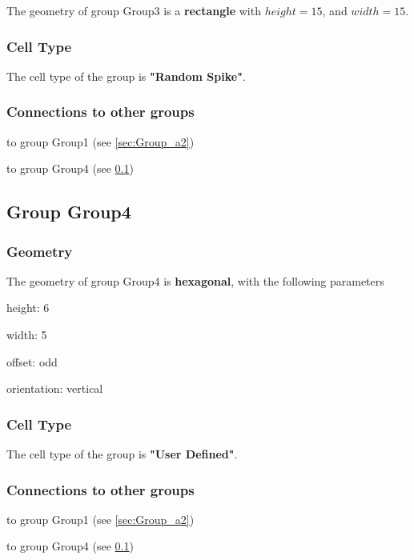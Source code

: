 \documentclass[a4paper, 11pt]{article}
\begin{document}
The geometry of group Group3 is a \textbf{rectangle} with
$height= 15$, and $width= 15$.

\subsubsection*{Cell Type}
The cell type of the group is \textbf{"Random Spike"}.

\subsubsection*{Connections to other groups}
\begin{compactenum}
\item to group Group1 (see \ref{sec:Group_a2})
\item to group Group4 (see \ref{sec:Group_a9})
\end{compactenum}

\subsection{Group Group4}
\label{sec:Group_a9}

\subsubsection*{Geometry}

The geometry of group Group4 is \textbf{hexagonal}, with
the following parameters
\begin{compactitem}
    \item height: 6
    \item width: 5
    \item offset: odd
    \item orientation: vertical
\end{compactitem}

\subsubsection*{Cell Type}
The cell type of the group is \textbf{"User Defined"}.

\subsubsection*{Connections to other groups}
\begin{compactenum}
\item to group Group1 (see \ref{sec:Group_a2})
\item to group Group4 (see \ref{sec:Group_a9})
\end{compactenum}
\end{document}
